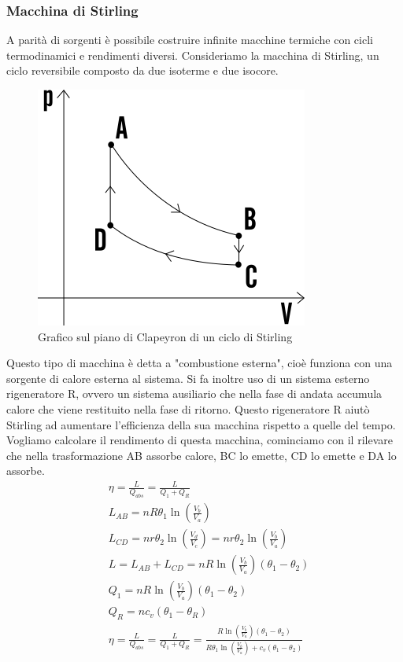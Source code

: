\documentclass[10pt,a4paper]{article}
\begin{document}
\subsubsection{Macchina di Stirling}
A parità di sorgenti è possibile costruire infinite macchine termiche con cicli termodinamici e rendimenti diversi. Consideriamo la macchina di Stirling, un ciclo reversibile composto da due isoterme e due isocore. 
\begin{figure}[h!]
	\centering
	\includegraphics[width=0.4\linewidth]{../images/ciclo_di_stirling}
	\caption{Grafico sul piano di Clapeyron di un ciclo di Stirling}
	\label{fig:ciclodistirling}
\end{figure}
\FloatBarrier
Questo tipo di macchina è detta a "combustione esterna", cioè funziona con una sorgente di calore esterna al sistema. Si fa inoltre uso di un sistema esterno rigeneratore R, ovvero un sistema ausiliario che nella fase di andata accumula calore che viene restituito nella fase di ritorno. Questo rigeneratore R aiutò Stirling ad aumentare l'efficienza della sua macchina rispetto a quelle del tempo. Vogliamo calcolare il rendimento di questa macchina, cominciamo con il rilevare che nella trasformazione AB assorbe calore, BC lo emette, CD lo emette e DA lo assorbe. 
\begin{align*}
&\eta = \frac{L}{Q_{abs}} = \frac{L}{Q_1 + Q_R}\\
&L_{AB}= n R \theta_1 \ln\left(\frac{V_b}{V_a}\right)\\
&L_{CD}= n r \theta_2 \ln\left(\frac{V_d}{V_c}\right) = n r \theta_2 \ln\left(\frac{V_b}{V_a}\right)\\
&L = L_{AB} + L_{CD} = n R \ln\left(\frac{V_b}{V_a}\right)(\theta_1 - \theta_2)\\
&Q_1 = n R \ln\left(\frac{V_b}{V_a}\right)(\theta_1 - \theta_2)\\
&Q_R = n c_v (\theta_1 - \theta_R)\\
&\eta = \frac{L}{Q_{abs}} = \frac{L}{Q_1 + Q_R} = \frac{R \ln\left(\frac{V_b}{V_a}\right)(\theta_1 - \theta_2)}{R\theta_1\ln(\frac{V_b}{V_a})+c_v (\theta_1 - \theta_2)}
\end{align*}
\end{document}
